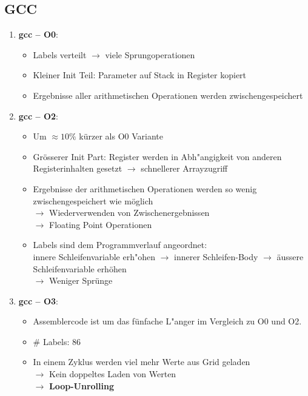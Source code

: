 \documentclass{article}
\begin{document}
\subsection*{GCC}
\begin{enumerate}
	\item{ \textbf{gcc -- O0}:
			\begin{itemize}
				\item Labels verteilt $\rightarrow$ viele Sprungoperationen
				\item Kleiner Init Teil: Parameter auf Stack in Register kopiert
				\item Ergebnisse aller arithmetischen Operationen werden zwischengespeichert
			\end{itemize}
		}
	\item{ \textbf{gcc -- O2}:
			\begin{itemize}
				\item Um $\approx 10\%$ k\"urzer als O0 Variante
				\item Gr\"osserer Init Part: Register werden in Abh"angigkeit
					von anderen Registerinhalten gesetzt $\rightarrow$ schnellerer Arrayzugriff
				\item Ergebnisse der arithmetischen Operationen werden so wenig
					zwischengespeichert wie m\"oglich\\
					$\rightarrow$ Wiederverwenden von Zwischenergebnissen\\
					$\rightarrow$ Floating Point Operationen
				\item Labels sind dem Programmverlauf angeordnet:\\
					innere Schleifenvariable erh"ohen $\rightarrow$ innerer Schleifen-Body $\rightarrow$
					\"aussere Schleifenvariable erh\"ohen\\
					$\longrightarrow$ Weniger Spr\"unge
			\end{itemize}
		}
	\item{ \textbf{gcc -- O3}:
			\begin{itemize}
				\item Assemblercode ist um das f\"unfache L"anger im Vergleich
					zu O0 und O2.
				\item \# Labels: 86
				\item In einem Zyklus werden viel mehr Werte aus Grid geladen\\
					$\rightarrow$ Kein doppeltes Laden von Werten\\
					$\rightarrow$ \textbf{Loop-Unrolling}
			\end{itemize}
		}
\end{enumerate}
\end{document}
